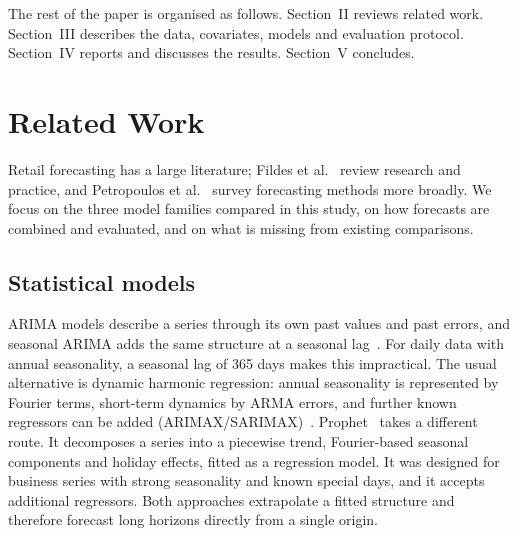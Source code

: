 \documentclass[conference]{IEEEtran}
\begin{document}
The rest of the paper is organised as follows.
Section~II reviews related work.
Section~III describes the data, covariates, models and evaluation protocol.
Section~IV reports and discusses the results.
Section~V concludes.

\section{Related Work}
Retail forecasting has a large literature; Fildes et al.~\cite{fildes2022retail} review research and practice, and Petropoulos et al.~\cite{petropoulos2022theory} survey forecasting methods more broadly.
We focus on the three model families compared in this study, on how forecasts are combined and evaluated, and on what is missing from existing comparisons.

\subsection{Statistical models}
ARIMA models describe a series through its own past values and past errors, and seasonal ARIMA adds the same structure at a seasonal lag~\cite{hyndman2021fpp3}.
For daily data with annual seasonality, a seasonal lag of 365 days makes this impractical.
The usual alternative is dynamic harmonic regression: annual seasonality is represented by Fourier terms, short-term dynamics by ARMA errors, and further known regressors can be added (ARIMAX/SARIMAX)~\cite{hyndman2021fpp3}.
Prophet~\cite{taylor2018prophet} takes a different route.
It decomposes a series into a piecewise trend, Fourier-based seasonal components and holiday effects, fitted as a regression model.
It was designed for business series with strong seasonality and known special days, and it accepts additional regressors.
Both approaches extrapolate a fitted structure and therefore forecast long horizons directly from a single origin.
\end{document}
